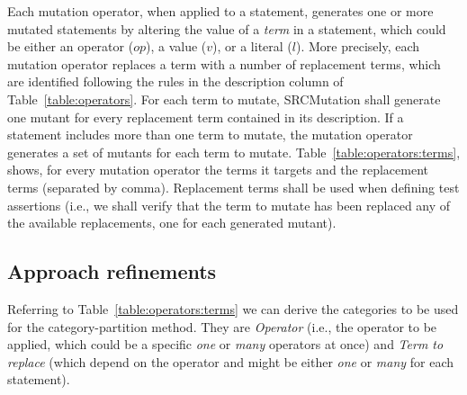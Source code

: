 Each mutation operator, when applied to a statement, generates one or more mutated statements by altering the value of a \emph{term} in a statement, which could be either an operator  ($op$), a value ($v$), or a literal ($l$). More precisely, each mutation operator  replaces a term with a number of replacement terms, which are identified following the rules in the description column of Table~\ref{table:operators}.
For each term to mutate, SRCMutation shall generate one mutant for every replacement term contained in its description.
If a statement includes more than one term to mutate, the mutation operator generates a set of mutants for each term to mutate. Table~\ref{table:operators:terms}, shows, for every mutation operator the terms it targets and the replacement terms (separated by comma). Replacement terms shall be used when defining test assertions (i.e., we shall verify that the term to mutate has been replaced any of the available replacements, one for each generated mutant).




\clearpage

\subsection{Approach refinements}

Referring to Table~\ref{table:operators:terms} we can derive the categories to be used for the category-partition method.
They are \emph{Operator} (i.e., the operator to be applied, which could be a specific \emph{one} or \emph{many} operators at once) and \emph{Term to replace} (which depend on the operator and might be either \emph{one} or \emph{many} for each statement).

